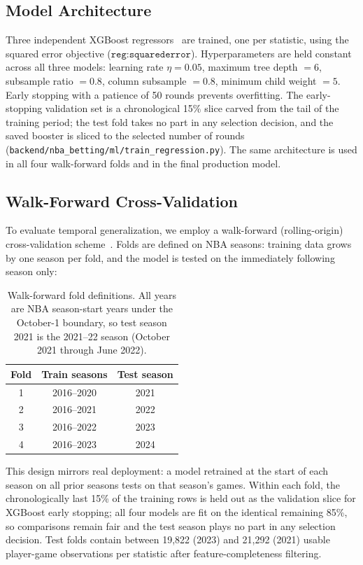 \documentclass[12pt, letterpaper]{article}
\begin{document}
\subsection{Model Architecture}

Three independent XGBoost regressors~\citep{chen2016xgboost} are trained,
one per statistic, using the squared error objective
($\texttt{reg:squarederror}$).
Hyperparameters are held constant across all three models:
learning rate $\eta = 0.05$, maximum tree depth $= 6$,
subsample ratio $= 0.8$, column subsample $= 0.8$,
minimum child weight $= 5$.
Early stopping with a patience of 50 rounds prevents overfitting.
The early-stopping validation set is a chronological 15\% slice carved
from the tail of the training period; the test fold takes no part in any
selection decision, and the saved booster is sliced to the selected number
of rounds (\texttt{backend/nba\_betting/ml/train\_regression.py}).
The same architecture is used in all four walk-forward folds and in
the final production model.

\subsection{Walk-Forward Cross-Validation}
\label{subsec:wfcv}

To evaluate temporal generalization, we employ a walk-forward
(rolling-origin) cross-validation scheme~\citep{cerqueira2020evaluating}.
Folds are defined on NBA seasons: training data grows by one season per
fold, and the model is tested on the immediately following season only:

\begin{table}[H]
\centering
\caption{Walk-forward fold definitions. All years are NBA season-start
         years under the October-1 boundary, so test season 2021 is the
         2021--22 season (October 2021 through June 2022).}
\label{tab:folds}
\begin{tabular}{ccc}
\toprule
\textbf{Fold} & \textbf{Train seasons} & \textbf{Test season} \\
\midrule
1 & 2016--2020 & 2021 \\
2 & 2016--2021 & 2022 \\
3 & 2016--2022 & 2023 \\
4 & 2016--2023 & 2024 \\
\bottomrule
\end{tabular}
\end{table}

This design mirrors real deployment: a model retrained at the start of each
season on all prior seasons tests on that season's games.
Within each fold, the chronologically last 15\% of the training rows is
held out as the validation slice for XGBoost early stopping; all four
models are fit on the identical remaining 85\%, so comparisons remain fair
and the test season plays no part in any selection decision.
Test folds contain between 19,822 (2023) and 21,292 (2021) usable
player-game observations per statistic after feature-completeness
filtering.
\end{document}
